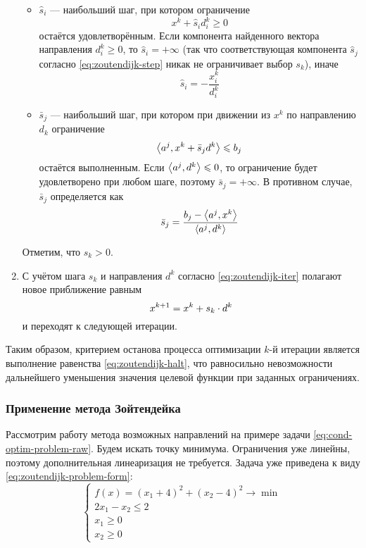 \begin{enumerate}
\begin{itemize}
  \item $\hat{s}_i$ — наибольший шаг, при котором ограничение
    \begin{equation*}
      x^k+\hat{s}_i d^k_i \geq 0
    \end{equation*}
    остаётся удовлетворённым. Если компонента найденного вектора
    направления $d^k_i \geq 0$, то $\hat{s}_i = +\infty$ (так что
    соответствующая компонента $\hat{s}_j$ согласно
    \eqref{eq:zoutendijk-step} никак не ограничивает выбор $s_k$),
    иначе
    \begin{equation*}
      \hat{s}_i = -\frac{x^k_i}{d^k_i}
    \end{equation*}

  \item $\bar{s}_j$ — наибольший шаг, при котором при движении из
    $x^k$ по направлению $d_k$ ограничение
    \begin{equation*}
      {\left \langle a^j, x^k+\bar{s}_j d^k \right \rangle} \leqslant b_j
    \end{equation*}
    остаётся выполненным. Если ${\left \langle a^j, d^k \right \rangle} \leqslant 0$, то
    ограничение будет удовлетворено при любом шаге, поэтому $\bar{s}_j
    = +\infty$. В противном случае, $\bar{s}_j$ определяется как
    \begin{equation*}
      \bar{s}_j = \frac{b_j-{\left \langle a^j, x^k \right \rangle}}{{\left \langle a^j, d^k \right \rangle}}
    \end{equation*}
  \end{itemize}
  Отметим, что $s_k>0$.
\item С учётом шага $s_k$ и направления $d^k$ согласно
  \eqref{eq:zoutendijk-iter} полагают новое приближение равным
  \begin{equation*}
    x^{k+1} = x^k + s_k \cdot d^k
  \end{equation*}
  и переходят к следующей итерации.
\end{enumerate}

Таким образом, критерием останова процесса оптимизации $k$-й итерации
является выполнение равенства \eqref{eq:zoutendijk-halt}, что
равносильно невозможности дальнейшего уменьшения значения целевой
функции при заданных ограничениях.

\subsubsection{Применение метода Зойтендейка}

Рассмотрим работу метода возможных направлений на примере задачи
\eqref{eq:cond-optim-problem-raw}. Будем искать точку минимума.
Ограничения уже линейны, поэтому дополнительная линеаризация не
требуется. Задача уже приведена к виду
\eqref{eq:zoutendijk-problem-form}:
\begin{equation}
  \label{eq:zoutendijk-problem}
  \begin{cases}
    f(x) = (x_1+4)^2 + (x_2-4)^2 \to \min \\
    2x_1-x_2 \leq 2 \\
    x_1 \geq 0 \\
    x_2 \geq 0
  \end{cases}
\end{equation}

